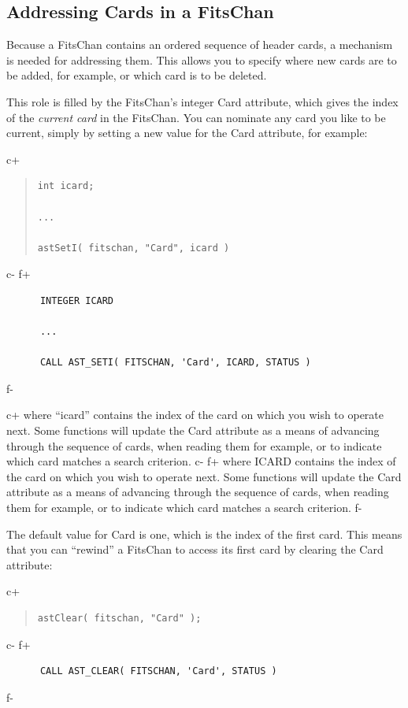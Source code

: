 \documentclass[twoside,11pt]{article}
\begin{document}
\subsection{\label{ss:addressingfitscards}Addressing Cards in a FitsChan}

Because a FitsChan contains an ordered sequence of header cards, a
mechanism is needed for addressing them. This allows you to specify
where new cards are to be added, for example, or which card is to be
deleted.

This role is filled by the FitsChan's integer Card attribute, which
gives the index of the {\em{current card}} in the FitsChan.  You can
nominate any card you like to be current, simply by setting a new
value for the Card attribute, for example:

c+
\begin{quote}
\small
\begin{verbatim}
int icard;

...

astSetI( fitschan, "Card", icard )
\end{verbatim}
\normalsize
\end{quote}
c-
f+
\small
\begin{verbatim}
      INTEGER ICARD

      ...

      CALL AST_SETI( FITSCHAN, 'Card', ICARD, STATUS )
\end{verbatim}
\normalsize
f-

c+
where ``icard'' contains the index of the card on which you wish to
operate next.  Some functions will update the Card attribute as a
means of advancing through the sequence of cards, when reading them
for example, or to indicate which card matches a search criterion.
c-
f+
where ICARD contains the index of the card on which you wish to
operate next.  Some functions will update the Card attribute as a
means of advancing through the sequence of cards, when reading them
for example, or to indicate which card matches a search criterion.
f-

The default value for Card is one, which is the index of the first
card. This means that you can ``rewind'' a FitsChan to access its
first card by clearing the Card attribute:

c+
\begin{quote}
\small
\begin{verbatim}
astClear( fitschan, "Card" );
\end{verbatim}
\normalsize
\end{quote}
c-
f+
\small
\begin{verbatim}
      CALL AST_CLEAR( FITSCHAN, 'Card', STATUS )
\end{verbatim}
\normalsize
f-
\end{document}
